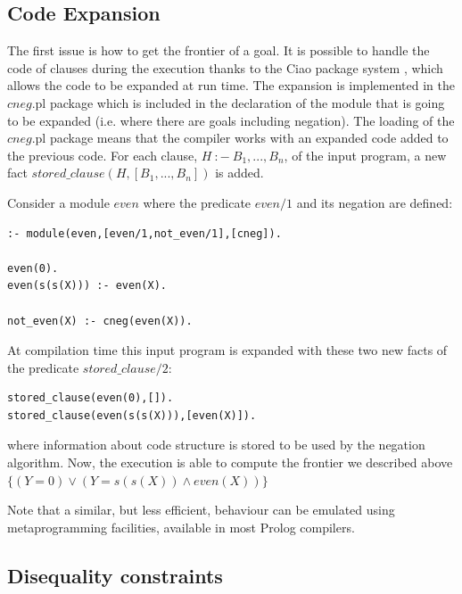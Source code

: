 \documentclass{tlp}
\begin{document}

\subsection{Code Expansion}
\label{expansion}

The first issue is how to get the frontier of a goal. It is possible to handle
the code of clauses during the execution thanks to the Ciao package system
\cite{ciao-modules-cl2000}, which allows the code to be expanded at run
time. The expansion is implemented in the $cneg$.pl package which is included
in the declaration of the module that is going to be expanded (i.e. where
there are goals including negation). The loading of the $cneg$.pl package
means that the compiler works with an expanded code added to the previous
code. For each clause, $H~:-~B_1,...,B_n$, of the input program, a new fact
$stored\_clause(H,[B_1,...,B_n])$ is added.

Consider a module $even$ where the predicate $even/1$ and its negation are
defined: 

\begin{verbatim}
:- module(even,[even/1,not_even/1],[cneg]).

even(0).
even(s(s(X))) :- even(X).

not_even(X) :- cneg(even(X)).
\end{verbatim}

At compilation time this input program is expanded with these two new facts of
the predicate $stored\_clause/2$:  

\begin{verbatim}
stored_clause(even(0),[]).
stored_clause(even(s(s(X))),[even(X)]).
\end{verbatim}

\noindent
where information about code structure is stored to be used by the negation
algorithm. Now, the execution is able to compute the frontier we described
above $\{ ( Y=0 ) \vee ( Y=s(s(X)) \wedge even(X) ) \}$

Note that a similar, but less efficient, behaviour can be emulated
using metaprogramming facilities, available in most Prolog compilers.
 

\subsection{Disequality constraints}
\label{disequality}
\end{document}
